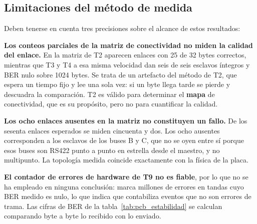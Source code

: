 \subsection{Limitaciones del método de medida}

Deben tenerse en cuenta tres precisiones sobre el alcance de estos resultados:

\textbf{Los conteos parciales de la matriz de conectividad no miden la calidad del enlace.} En la
matriz de T2 aparecen enlaces con 25 de 32 bytes correctos, mientras que T3 y T4 a esa misma
velocidad dan seis de seis esclavos íntegros y BER nulo sobre 1024 bytes. Se trata de un artefacto
del método de T2, que espera un tiempo fijo y lee una sola vez: si un byte llega tarde se pierde y
descuadra la comparación. T2 es válido para determinar el \textbf{mapa} de conectividad, que es su
propósito, pero no para cuantificar la calidad.

\textbf{Los ocho enlaces ausentes en la matriz no constituyen un fallo.} De los sesenta enlaces
esperados se miden cincuenta y dos. Los ocho ausentes corresponden a los esclavos de los buses B y
C, que no se oyen entre sí porque esos buses son RS422 punto a punto en estrella desde el maestro,
y no multipunto. La topología medida coincide exactamente con la física de la placa.

\textbf{El contador de errores de hardware de T9 no es fiable}, por lo que no se ha empleado en
ninguna conclusión: marca millones de errores en tandas cuyo BER medido es nulo, lo que indica que
contabiliza eventos que no son errores de trama. Las cifras de BER de la
tabla~\ref{tab:pcb_estabilidad} se calculan comparando byte a byte lo recibido con lo enviado.
